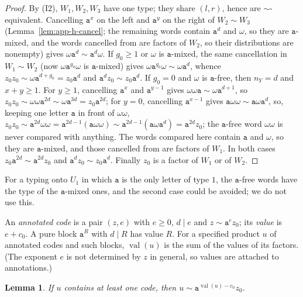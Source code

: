\documentclass[11pt]{article}
\numberwithin{equation}{section}
\theoremstyle{plain}
\newtheorem{lemma}[theorem]{Lemma}
\theoremstyle{definition}
\theoremstyle{remark}
\theoremstyle{plain}
\begin{document}
\begin{proof}
By (I2), $W_1,W_2,W_3$ have one type; they share $(l,r)$, hence are
$\sim$-equivalent.  Cancelling $\mathtt a^x$ on the left and $\mathtt a^y$ on the
right of $W_2\sim W_3$ (Lemma~\ref{lem:app-h-cancel}; the remaining words contain
$\mathtt a^d$ and $\omega$, so they are $\mathtt a$-mixed, and the words cancelled
from are factors of $W_2$, so their distributions are nonempty) gives
$\omega\mathtt a^d\sim\mathtt a^d\omega$.  If $g_0\ge1$
or $\omega$ is $\mathtt a$-mixed, the same cancellation in $W_1\sim W_2$ (now
$\omega\mathtt a^{g_0}\omega$ is $\mathtt a$-mixed) gives $\omega\mathtt
a^{g_0}\omega\sim\omega\mathtt a^d$, whence $z_0z_0\sim\omega\mathtt
a^{d+g_0}=z_0\mathtt a^d$ and $\mathtt a^dz_0\sim z_0\mathtt a^d$.  If $g_0=0$ and
$\omega$ is $\mathtt a$-free, then $n_Y=d$ and $x+y\ge1$.  For $y\ge1$,
cancelling $\mathtt a^x$ and $\mathtt a^{y-1}$ gives $\omega\omega\mathtt
a\sim\omega\mathtt a^{d+1}$, so $z_0z_0\sim\omega\omega\mathtt a^{2d}\sim\omega\mathtt
a^{3d}=z_0\mathtt a^{2d}$; for $y=0$, cancelling $\mathtt a^{x-1}$ gives $\mathtt
a\omega\omega\sim\mathtt a\omega\mathtt a^d$, so, keeping one letter $\mathtt a$
in front of $\omega\omega$, $z_0z_0\sim\mathtt a^{2d}\omega\omega=\mathtt
a^{2d-1}(\mathtt a\omega\omega)\sim\mathtt a^{2d-1}(\mathtt a\omega\mathtt
a^d)=\mathtt a^{2d}z_0$; the $\mathtt a$-free word $\omega\omega$ is never compared
with anything.  The words compared here contain
$\mathtt a$ and $\omega$, so they are $\mathtt a$-mixed, and those cancelled from
are factors of $W_1$.  In both cases $z_0\mathtt
a^{2d}\sim\mathtt a^{2d}z_0$ and $\mathtt a^dz_0\sim z_0\mathtt a^d$.  Finally $z_0$
is a factor of $W_1$ or of $W_2$.
\end{proof}

For a typing onto $U_1$ in which $\mathtt a$ is the only letter of type $1$, the
$\mathtt a$-free words have the type of the $\mathtt a$-mixed ones, and the
second case could be avoided; we do not use this.

An \emph{annotated code} is a pair $(z,e)$ with $e\ge0$, $d\mid e$ and $z\sim
\mathtt a^ez_0$; its \emph{value} is $e+c_0$.  A pure block $\mathtt a^R$ with
$d\mid R$ has value $R$.  For a specified product $u$ of annotated codes and
such blocks, $\operatorname{val}(u)$ is the sum of the values of its factors.
(The exponent $e$ is not determined by $z$ in general, so values are attached
to annotations.)

\begin{lemma}
\label{lem:app-h-collapse}
If $u$ contains at least one code, then $u\sim\mathtt
a^{\operatorname{val}(u)-c_0}z_0$.
\end{lemma}
\end{document}
